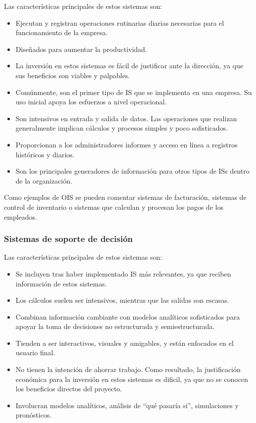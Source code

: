 Las características principales de estos sistemas son:
\begin{itemize}
\item Ejecutan y registran operaciones rutinarias diarias necesarias para el funcionamiento de la empresa. 
\item Diseñados para aumentar la productividad.
\item La inversión en estos sistemas es fácil de justificar ante la dirección, ya que sus beneficios son viables y palpables. 
\item Comúnmente, son el primer tipo de IS que se implementa en una empresa. Su uso inicial apoya los esfuerzos a nivel operacional.
\item Son intensivos en entrada y salida de datos. Las operaciones que realizan generalmente implican cálculos y procesos simples y poco sofisticados. 
\item Proporcionan a los administradores informes y acceso en línea a registros históricos y diarios.
\item Son los principales generadores de información para otros tipos de ISs dentro de la organización.
\end{itemize}

Como ejemplos de OIS se pueden comentar sistemas de facturación, sistemas de control de inventario o sistemas que calculan y procesan los pagos de los empleados. 

\subsubsection{Sistemas de soporte de decisión}

Las características principales de estos sistemas son:
\begin{itemize}
\item Se incluyen tras haber implementado IS más relevantes, ya que reciben información de estos sistemas.
\item Los cálculos suelen ser intensivos, mientras que las salidas son escasas. 
\item Combinan información cambiante con modelos analíticos sofisticados para apoyar la toma de decisiones no estructurada y semiestructurada. 
\item Tienden a ser interactivos, visuales y amigables, y están enfocados en el usuario final.
\item No tienen la intención de ahorrar trabajo. Como resultado, la justificación económica para la inversión en estos sistemas es dificil, ya que no se conocen los beneficios directos del proyecto. 
\item Involucran modelos analíticos, análisis de ``qué pasaría si'', simulaciones y pronósticos.
\end{itemize}

